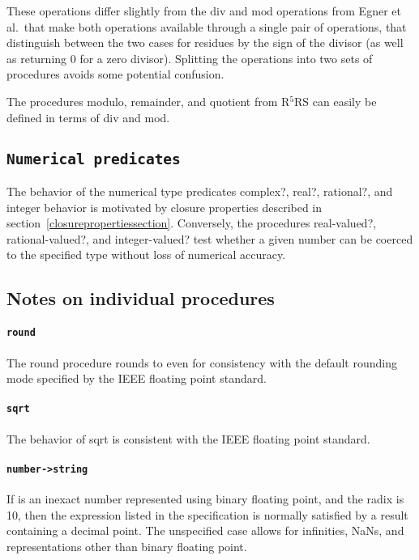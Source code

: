 \documentclass[twoside,twocolumn]{algol60}
\newcommand{\rn}[1]{R$^{#1}$RS}
\begin{document}
These operations differ slightly from the $\mathrm{div}$ and
$\mathrm{mod}$ operations from Egner et al.\ that make both operations
available through a single pair of operations, that distinguish
between the two cases for residues by the sign of the divisor (as well
as returning $0$ for a zero divisor).  Splitting the operations into
two sets of procedures avoids some potential confusion.

The procedures {\cf modulo}, {\cf remainder}, and {\cf quotient} from
\rn{5} can easily be defined in terms of {\cf div} and {\cf mod}.

\subsection{{\tt Numerical predicates}}

The behavior of the numerical type predicates {\cf complex?}, {\cf
  real?}, {\cf rational?}, and {\cf integer} behavior is motivated by
closure properties described in
section~\ref{closurepropertiessection}.  Conversely, the procedures
{\cf real-valued?}, {\cf rational-valued?}, and {\cf integer-valued?}
test whether a given number can be coerced to the specified type
without loss of numerical accuracy.

\subsection{Notes on individual procedures}

\paragraph{{\tt round}}

The {\cf round} procedure rounds to even for consistency with the
default rounding mode specified by the IEEE floating point standard.

\paragraph{{\tt sqrt}}

The behavior of {\cf sqrt} is consistent with the IEEE floating point
standard.

\paragraph{{\tt number->string}}

If  is an inexact number represented using binary floating
point, and the radix is 10, then the expression listed in the
specification is normally satisfied by a result containing a decimal
point.  The unspecified case allows for infinities, NaNs, and
representations other than binary floating point.
\end{document}
